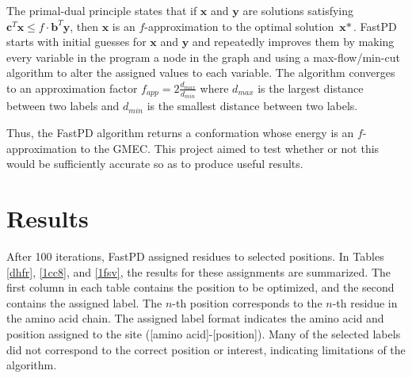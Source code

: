 \documentclass[11pt]{article}
\begin{document}
	The primal-dual principle states that if $\textbf{x}$ and $\textbf{y}$ are
	solutions satisfying $\textbf{c}^T\textbf{x} \leq f \cdot \textbf{b}^T\textbf{y}$,
	then $\textbf{x}$ is an $f$-approximation to the optimal solution $\textbf{x}*$.
	FastPD starts with initial guesses for $\textbf{x}$ and $\textbf{y}$ and 
	repeatedly improves them by making every variable in the program a node in the
	graph and using a max-flow/min-cut algorithm to alter the assigned values to
	each variable. The algorithm converges to an approximation factor
	$f_{app} = 2 \frac{d_{max}}{d_{min}}$ where $d_{max}$ is the largest distance
	between two labels and $d_{min}$ is the smallest distance between two labels. 
	
	Thus, the FastPD algorithm returns a conformation whose energy is an $f$-
	approximation to the GMEC. This project aimed to test whether or not this would
	be sufficiently accurate so as to produce useful results. 

	\section{Results}
	After 100 iterations, FastPD assigned residues to selected positions.  In Tables
	\ref{dhfr}, \ref{1cc8}, and \ref{1fsv}, the results for these assignments are
	summarized.  The first column in each table contains the position to be optimized,
	and the second contains the assigned label. The $n$-th position corresponds to
	the $n$-th residue in the amino acid chain. The assigned label format indicates
	the amino acid and position assigned to the site ([amino acid]-[position]).  Many
	of the selected labels did not correspond to the correct position or interest,
	indicating limitations of the algorithm. 
	
\end{document}
